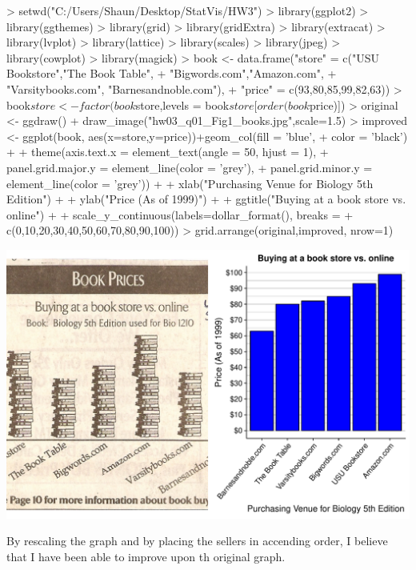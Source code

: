 \documentclass[12pt,letterpaper,final]{article}
\begin{document}
\begin{enumerate}
\begin{Schunk}
\begin{Sinput}
> setwd("C:/Users/Shaun/Desktop/StatVis/HW3")
> library(ggplot2)
> library(ggthemes)
> library(grid)
> library(gridExtra)
> library(extracat)
> library(lvplot)
> library(lattice)
> library(scales)
> library(jpeg)
> library(cowplot)
> library(magick)
> book <- data.frame("store" = c("USU Bookstore","The Book Table",
+                                "Bigwords.com","Amazon.com",
+                                "Varsitybooks.com", "Barnesandnoble.com"),
+                    "price" = c(93,80,85,99,82,63))
> book$store <- factor(book$store,levels = book$store[order(book$price)])
> original <- ggdraw() + draw_image("hw03_q01_Fig1_books.jpg",scale=1.5)
> improved <- ggplot(book, aes(x=store,y=price))+geom_col(fill = 'blue', 
+                                                         color = 'black') + 
+   theme(axis.text.x = element_text(angle = 50, hjust = 1), 
+         panel.grid.major.y = element_line(color = 'grey'),
+         panel.grid.minor.y = element_line(color = 'grey')) + 
+   xlab("Purchasing Venue for Biology 5th Edition") + 
+   ylab("Price (As of 1999)") + 
+   ggtitle("Buying at a book store vs. online") + 
+   scale_y_continuous(labels=dollar_format(), breaks = 
+                        c(0,10,20,30,40,50,60,70,80,90,100))
> grid.arrange(original,improved, nrow=1)
\end{Sinput}
\end{Schunk}
\includegraphics{hw03_bartschi-001}

By rescaling the graph and by placing the sellers in accending order, I believe that I have been able to improve upon th original graph.\\


\end{enumerate}
\end{document}
